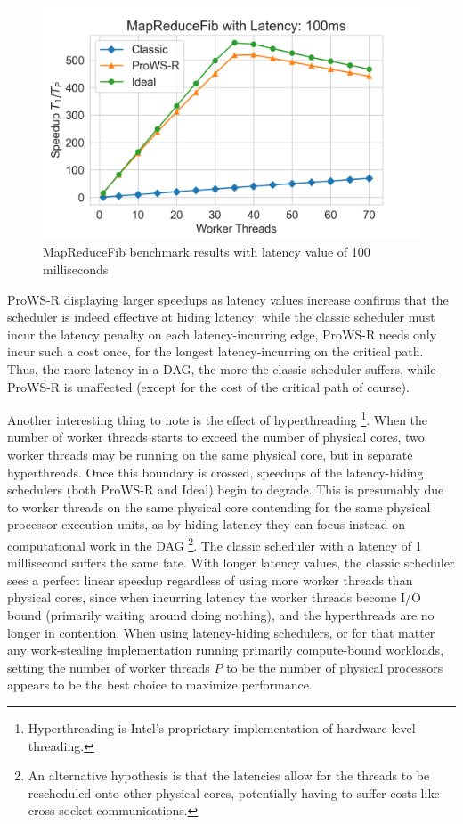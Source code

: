\documentclass[bsc,frontabs,singlespacing,parskip,deptreport,normalheadings]{infthesis}
\begin{document}
\begin{figure}[ht]
    \centering
    \includegraphics[width=0.8\linewidth]{figures/map_reduce_plot_latency_100.png}
    \caption{MapReduceFib benchmark results with latency value of 100 milliseconds}
    \label{fig:map_reduce_plots_100ms}
\end{figure}

ProWS-R displaying larger speedups as latency values increase confirms that the
scheduler is indeed effective at hiding latency: while the classic scheduler
must incur the latency penalty on each latency-incurring edge, ProWS-R needs
only incur such a cost once, for the longest latency-incurring on the critical
path. Thus, the more latency in a DAG, the more the classic scheduler suffers,
while ProWS-R is unaffected (except for the cost of the critical path of
course).

Another interesting thing to note is the effect of hyperthreading
\footnote{Hyperthreading is Intel's proprietary implementation of hardware-level
threading.}. When the number of worker threads starts to exceed the number of
physical cores, two worker threads may be running on the same physical core, but
in separate hyperthreads. Once this boundary is crossed, speedups of the
latency-hiding schedulers (both ProWS-R and Ideal) begin to degrade. This is
presumably due to worker threads on the same physical core contending for the
same physical processor execution units, as by hiding latency they can focus
instead on computational work in the DAG \footnote{An alternative hypothesis is
that the latencies allow for the threads to be rescheduled onto other physical
cores, potentially having to suffer costs like cross socket communications.}.
The classic scheduler with a latency of 1 millisecond suffers the same fate.
With longer latency values, the classic scheduler sees a perfect linear speedup
regardless of using more worker threads than physical cores, since when
incurring latency the worker threads become I/O bound (primarily waiting around
doing nothing), and the hyperthreads are no longer in contention. When using
latency-hiding schedulers, or for that matter any work-stealing implementation
running primarily compute-bound workloads, setting the number of worker threads
\(P\) to be the number of physical processors appears to be the best choice to
maximize performance.
\end{document}
